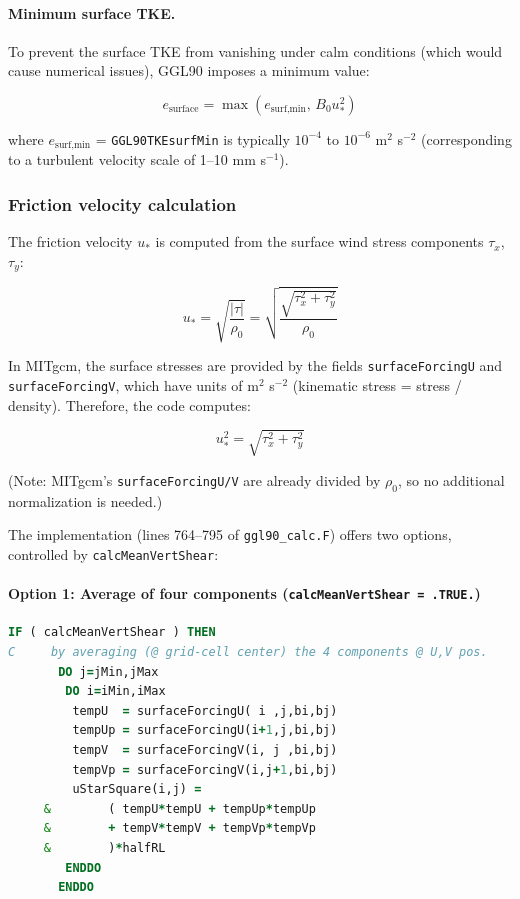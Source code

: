 \documentclass[12pt,letterpaper]{article}
\begin{document}
\paragraph{Minimum surface TKE.} To prevent the surface TKE from vanishing under calm conditions (which would cause numerical issues), GGL90 imposes a minimum value:

\begin{equation}
e_{\text{surface}} = \max(e_{\text{surf,min}}, \, B_0 u_*^2)
\label{eq:surface_bc_min}
\end{equation}

where $e_{\text{surf,min}}$ = \verb|GGL90TKEsurfMin| is typically $10^{-4}$ to $10^{-6}$ m$^2$ s$^{-2}$ (corresponding to a turbulent velocity scale of 1--10 mm s$^{-1}$).

\subsubsection{Friction velocity calculation}

The friction velocity $u_*$ is computed from the surface wind stress components $\tau_x$, $\tau_y$:

\begin{equation}
u_* = \sqrt{\frac{|\tau|}{\rho_0}} = \sqrt{\frac{\sqrt{\tau_x^2 + \tau_y^2}}{\rho_0}}
\label{eq:ustar_definition}
\end{equation}

In MITgcm, the surface stresses are provided by the fields \verb|surfaceForcingU| and \verb|surfaceForcingV|, which have units of m$^2$ s$^{-2}$ (kinematic stress = stress / density). Therefore, the code computes:

\begin{equation}
u_*^2 = \sqrt{\tau_x^2 + \tau_y^2}
\label{eq:ustar_squared}
\end{equation}

(Note: MITgcm's \verb|surfaceForcingU/V| are already divided by $\rho_0$, so no additional normalization is needed.)

The implementation (lines 764--795 of \verb|ggl90_calc.F|) offers two options, controlled by \verb|calcMeanVertShear|:

\paragraph{Option 1: Average of four components (\texttt{calcMeanVertShear = .TRUE.})}

\begin{lstlisting}[language=Fortran,caption={(ggl90\_calc.F:L764--783) Surface friction velocity: Option 1}]
      IF ( calcMeanVertShear ) THEN
C     by averaging (@ grid-cell center) the 4 components @ U,V pos.
       DO j=jMin,jMax
        DO i=iMin,iMax
         tempU  = surfaceForcingU( i ,j,bi,bj)
         tempUp = surfaceForcingU(i+1,j,bi,bj)
         tempV  = surfaceForcingV(i, j ,bi,bj)
         tempVp = surfaceForcingV(i,j+1,bi,bj)
         uStarSquare(i,j) =
     &        ( tempU*tempU + tempUp*tempUp
     &        + tempV*tempV + tempVp*tempVp
     &        )*halfRL
        ENDDO
       ENDDO
\end{lstlisting}
\end{document}

